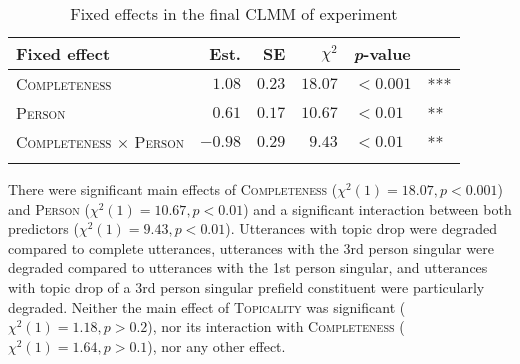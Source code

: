 \begin{table}
\caption{Fixed effects in the final CLMM of experiment }
\centering
\begin{tabular}{lrrrll}
\lsptoprule
Fixed effect & Est. & SE & $\chi^2$ & \textit{p}-value &   \\
\midrule
\textsc{Completeness} & $1.08$ & $0.23$ & $18.07$ & $< 0.001$ & ***\\
\textsc{Person} & $0.61$ & $0.17$ & $10.67$ & $< 0.01$ & **\\
\textsc{Completeness $\times$ Person} & $-0.98$ & $0.29$ & $9.43$ & $< 0.01$ & **\\
\lspbottomrule
\end{tabular}
\label{tab:model.exp.top.mv}
\end{table}

\noindent
There were significant main effects of \textsc{Completeness} ($\chi^2(1) = 18.07, p < 0.001$) and \textsc{Person} ($\chi^2(1) = 10.67, p < 0.01$) and a significant interaction between both predictors ($\chi^2(1) = 9.43, p < 0.01$).
Utterances with topic drop were degraded compared to complete utterances, utterances with the 3rd person singular were degraded compared to  utterances with the 1st person singular, and utterances with topic drop of a 3rd person singular prefield constituent were particularly degraded.
Neither the main effect of \textsc{Topicality} was significant ($\chi^2(1) = 1.18, p > 0.2$), nor its interaction with \textsc{Completeness} ($\chi^2(1) = 1.64, p > 0.1$), nor any other effect.

